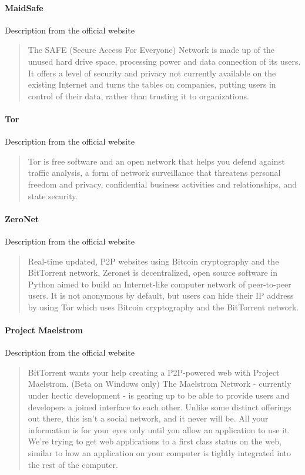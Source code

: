 \paragraph{MaidSafe\cite{MaidSafe2014MaidSafe.netCommunity}}
Description from the official website \cite{MaidSafeMaidSafe}
\blockquote{The SAFE (Secure Access For Everyone) Network is made up of the unused hard drive space, processing power and data connection of its users. It offers a level of security and privacy not currently available on the existing Internet and turns the tables on companies, putting users in control of their data, rather than trusting it to organizations.}

\paragraph{Tor\cite{Dingledine2004Tor:Router}}
Description from the official website \cite{TorTor}
\blockquote{Tor is free software and an open network that helps you defend against traffic analysis, a form of network surveillance that threatens personal freedom and privacy, confidential business activities and relationships, and state security.}

\paragraph{ZeroNet\cite{Zeronet2016ZeroNet}}
Description from the official website \cite{ZeroNetZeroNet}
\blockquote{Real-time updated, P2P websites using Bitcoin cryptography and the BitTorrent network. Zeronet is decentralized, open source software in Python aimed to build an Internet-like computer network of peer-to-peer users. It is not anonymous by default, but users can hide their IP address by using Tor which uses Bitcoin cryptography and the BitTorrent network.}

\paragraph{Project Maelstrom}
Description from the official website \cite{BitTorrentProjectMaelstrom}
\blockquote{BitTorrent wants your help creating a P2P-powered web with Project Maelstrom. (Beta on Windows only)
The Maelstrom Network - currently under hectic development - is gearing up to be able to provide users and developers a joined interface to each other. Unlike some distinct offerings out there, this isn't a social network, and it never will be. All your information is for your eyes only until you allow an application to use it. We're trying to get web applications to a first class status on the web, similar to how an application on your computer is tightly integrated into the rest of the computer.}

